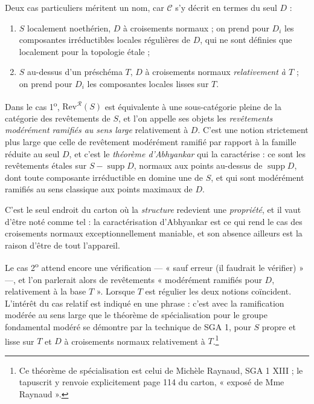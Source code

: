 \documentclass[11pt,a4paper]{article}
\begin{document}
Deux cas particuliers méritent un nom, car $\mathcal{C}$ s'y décrit en termes
du seul $D$ :

\begin{enumerate}
  \item[1\textsuperscript{o})] $S$ localement noethérien, $D$ à croisements
    normaux ; on prend pour $D_{i}$ les composantes irréductibles locales
    régulières de $D$, qui ne sont définies que localement pour la topologie
    étale ;
  \item[2\textsuperscript{o})] $S$ au-dessus d'un préschéma $T$, $D$ à
    croisements normaux \emph{relativement à $T$} ; on prend pour $D_{i}$ les
    composantes locales lisses sur $T$.
\end{enumerate}

Dans le cas 1\textsuperscript{o}, $\mathrm{Rev}^{\mathcal{R}}(S)$ est
équivalente à une sous-catégorie pleine de la catégorie des revêtements de $S$,
et l'on appelle ses objets les \emph{revêtements modérément ramifiés au sens
large} relativement à $D$. C'est une notion strictement plus large que celle de
revêtement modérément ramifié par rapport à la famille réduite au seul $D$, et
c'est le \emph{théorème d'Abhyankar} qui la caractérise : ce sont les
revêtements étales sur $S - \operatorname{supp} D$, normaux aux points
au-dessus de $\operatorname{supp} D$, dont toute composante irréductible en
domine une de $S$, et qui sont modérément ramifiés au sens classique aux points
maximaux de $D$.

C'est le seul endroit du carton où la \emph{structure} redevient une
\emph{propriété}, et il vaut d'être noté comme tel : la caractérisation
d'Abhyankar est ce qui rend le cas des croisements normaux exceptionnellement
maniable, et son absence ailleurs est la raison d'être de tout l'appareil.

Le cas 2\textsuperscript{o} attend encore une vérification --- « sauf erreur
(il faudrait le vérifier) » ---, et l'on parlerait alors de revêtements
« modérément ramifiés pour $D$, relativement à la base $T$ ». Lorsque $T$ est
régulier les deux notions coïncident. L'intérêt du cas relatif est indiqué en
une phrase : c'est avec la ramification modérée au sens large que le théorème
de spécialisation pour le groupe fondamental modéré se démontre par la
technique de SGA 1, pour $S$ propre et lisse sur $T$ et $D$ à croisements
normaux relativement à $T$.\footnote{Ce théorème de spécialisation est celui de
Michèle Raynaud, SGA 1 XIII ; le tapuscrit y renvoie explicitement page 114 du
carton, « exposé de Mme Raynaud ».}
\end{document}
